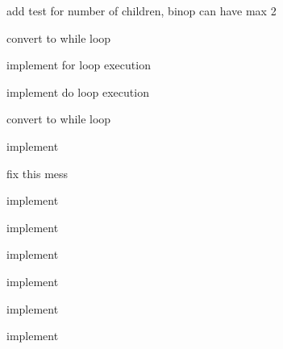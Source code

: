 
\begin{DoxyRefList}
\item[\label{todo__todo000001}%
\hypertarget{todo__todo000001}{}%
Class \hyperlink{classBinop}{Binop} ]add test for number of children, binop can have max 2  
\item[\label{todo__todo000003}%
\hypertarget{todo__todo000003}{}%
Member \hyperlink{classLoop_af57e9c094063c514758dfe7bd986d6e7a1dd9cd3dd842ae131b6f73ed04063cdd}{Loop\+:\+:Do} ]convert to while loop  
\item[\label{todo__todo000017}%
\hypertarget{todo__todo000017}{}%
Member \hyperlink{classLoop_a661edc5e6b0f90787e2a55922109f110}{Loop\+:\+:execute} (\hyperlink{classEnvironment}{Environment} \&env)]implement for loop execution 

implement do loop execution  
\item[\label{todo__todo000002}%
\hypertarget{todo__todo000002}{}%
Member \hyperlink{classLoop_af57e9c094063c514758dfe7bd986d6e7a681be1f5a1ab60d13010c6df3358088e}{Loop\+:\+:While} ]convert to while loop  
\item[\label{todo__todo000011}%
\hypertarget{todo__todo000011}{}%
Member \hyperlink{classNode_a8dad370be1595f49e0a7c2406a91e867a9b98ce84dc5f406e0743acc13f03aaf6}{Node\+:\+:Double\+Dot} ]implement  
\item[\label{todo__todo000019}%
\hypertarget{todo__todo000019}{}%
Member \hyperlink{classNode_ad2758f63dc60560b83e1d8a038df6e86}{Node\+:\+:execute} (\hyperlink{classEnvironment}{Environment} \&env)]fix this mess  
\item[\label{todo__todo000010}%
\hypertarget{todo__todo000010}{}%
Member \hyperlink{classNode_a8dad370be1595f49e0a7c2406a91e867a12f1dc625982c23638509a4039543b59}{Node\+:\+:Field\+Element} ]implement  
\item[\label{todo__todo000007}%
\hypertarget{todo__todo000007}{}%
Member \hyperlink{classNode_a8dad370be1595f49e0a7c2406a91e867a496a823a62742a6ebb9f4fb757e02ce4}{Node\+:\+:Function\+Name} ]implement  
\item[\label{todo__todo000012}%
\hypertarget{todo__todo000012}{}%
Member \hyperlink{classNode_a8dad370be1595f49e0a7c2406a91e867ad05e3fa202cceccd870b5aac8467623c}{Node\+:\+:Hash} ]implement  
\item[\label{todo__todo000008}%
\hypertarget{todo__todo000008}{}%
Member \hyperlink{classNode_a8dad370be1595f49e0a7c2406a91e867a1a3ec9cbafad290cdd86122121b61391}{Node\+:\+:List\+Name} ]implement  
\item[\label{todo__todo000013}%
\hypertarget{todo__todo000013}{}%
Member \hyperlink{classNode_a8dad370be1595f49e0a7c2406a91e867a183ed1e4cc2be1e5df44762c452281ef}{Node\+:\+:Name} ]implement  
\item[\label{todo__todo000014}%
\hypertarget{todo__todo000014}{}%
Member \hyperlink{classNode_a8dad370be1595f49e0a7c2406a91e867aab13754f7d035f904f4fc861bc6ad211}{Node\+:\+:Return} ]implement 


\end{DoxyRefList}

